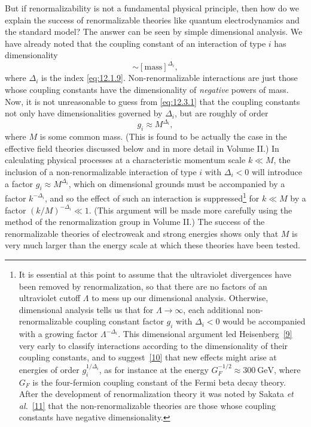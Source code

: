 But if renormalizability is not a fundamental physical principle, then how do
we explain the success of renormalizable theories like quantum
electrodynamics and the standard model? The answer can be seen by simple
dimensional analysis. We have already noted that the coupling constant of an
interaction of type $i$ has dimensionality
\begin{equation}
[g_i]\sim[\mathrm{mass}]^{\Delta_i},
\tag{12.3.1}\label{eq:12.3.1}
\end{equation}
where $\Delta_i$ is the index \eqref{eq:12.1.9}. Non-renormalizable
interactions are just those whose coupling constants have the dimensionality
of \emph{negative} powers of mass. Now, it is not unreasonable to guess from
\eqref{eq:12.3.1} that the coupling constants not only have dimensionalities
governed by $\Delta_i$, but are roughly of order
\begin{equation}
g_i\approx M^{\Delta_i},
\tag{12.3.2}\label{eq:12.3.2}
\end{equation}
where $M$ is some common mass. (This is found to be actually the case in the
effective field theories discussed below and in more detail in Volume II.) In
calculating physical processes at a characteristic momentum scale $k\ll M$,
the inclusion of a non-renormalizable interaction of type $i$ with
$\Delta_i<0$ will introduce a factor $g_i\approx M^{\Delta_i}$, which on
dimensional grounds must be accompanied by a factor $k^{-\Delta_i}$, and so
the effect of such an interaction is suppressed\footnote{It is essential at
this point to assume that the ultraviolet divergences have been removed by
renormalization, so that there are no factors of an ultraviolet cutoff
$\Lambda$ to mess up our dimensional analysis. Otherwise, dimensional
analysis tells us that for $\Lambda\to\infty$, each additional
non-renormalizable coupling constant factor $g_i$ with $\Delta_i<0$ would be
accompanied with a growing factor $\Lambda^{-\Delta_i}$. This dimensional
argument led Heisenberg~\hyperref[ref:12.9]{[9]} very early to classify
interactions according to the dimensionality of their coupling constants, and
to suggest~\hyperref[ref:12.10]{[10]} that new effects might arise at energies
of order $g_i^{1/\Delta_i}$, as for instance at the energy
$G_F^{-1/2}\approx 300\ \mathrm{GeV}$, where $G_F$ is the four-fermion coupling
constant of the Fermi beta decay theory. After the development of
renormalization theory it was noted by Sakata \emph{et
al.}~\hyperref[ref:12.11]{[11]} that the non-renormalizable theories are those
whose coupling constants have negative dimensionality.} for $k\ll M$ by a
factor $(k/M)^{-\Delta_i}\ll 1$. (This argument will be made more carefully
using the method of the renormalization group in Volume II.) The success of
the renormalizable theories of electroweak and strong energies shows only that
$M$ is very much larger than the energy scale at which these theories have
been tested.


